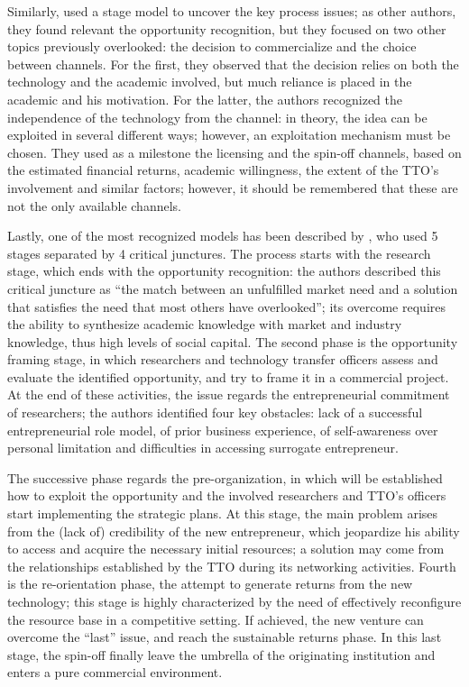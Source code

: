 Similarly, \citet{Lockett2005} used a stage model to uncover the key process issues; as other authors, they found relevant the opportunity recognition, but they focused on two other topics previously overlooked: the decision to commercialize and the choice between channels. For the first, they observed that the decision relies on both the technology and the academic involved, but much reliance is placed in the academic and his motivation. For the latter, the authors recognized the independence of the technology from the channel: in theory, the idea can be exploited in several different ways; however, an exploitation mechanism must be chosen. They used as a milestone the licensing and the spin-off channels, based on the estimated financial returns, academic willingness, the extent of the TTO's involvement and similar factors; however, it should be remembered that these are not the only available channels.

Lastly, one of the most recognized models has been described by \citet{Vohora2004}, who used 5 stages separated by 4 critical junctures. The process starts with the research stage, which ends with the opportunity recognition: the authors described this critical juncture as \enquote{the match between an unfulfilled market need and a solution that satisfies the need that most others have overlooked}; its overcome requires the ability to synthesize academic knowledge with market and industry knowledge, thus high levels of social capital. The second phase is the opportunity framing stage, in which researchers and technology transfer officers assess and evaluate the identified opportunity, and try to frame it in a commercial project. At the end of these activities, the issue regards the entrepreneurial commitment of researchers; the authors identified four key obstacles: lack of a successful entrepreneurial role model, of prior business experience, of self-awareness over personal limitation and difficulties in accessing surrogate entrepreneur. 

The successive phase regards the pre-organization, in which will be established how to exploit the opportunity and the involved researchers and TTO's officers start implementing the strategic plans. At this stage, the main problem arises from the (lack of) credibility of the new entrepreneur, which jeopardize his ability to access and acquire the necessary initial resources; a solution may come from the relationships established by the TTO during its networking activities. Fourth is the re-orientation phase, the attempt to generate returns from the new technology; this stage is highly characterized by the need of effectively reconfigure the resource base in a competitive setting. If achieved, the new venture can overcome the \enquote{last} issue, and reach the sustainable returns phase. In this last stage, the spin-off finally leave the umbrella of the originating institution and enters a pure commercial environment.

